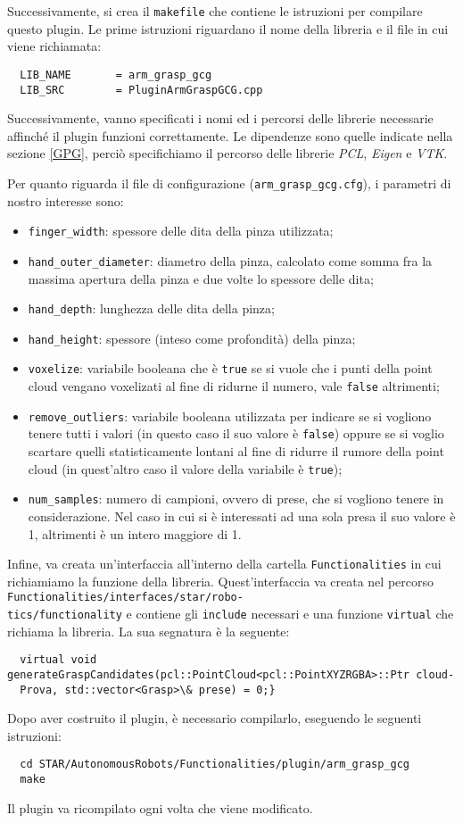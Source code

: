 \documentclass{report}
\begin{document}
\indent Successivamente, si crea il \texttt{makefile} che contiene le istruzioni per compilare questo plugin. Le prime istruzioni riguardano il nome della libreria e il file in cui viene richiamata:
\begin{verbatim}
  LIB_NAME       = arm_grasp_gcg
  LIB_SRC        = PluginArmGraspGCG.cpp
\end{verbatim} 
Successivamente, vanno specificati i nomi ed i percorsi delle librerie necessarie affinché il plugin funzioni correttamente. Le dipendenze sono quelle indicate nella sezione \ref{GPG}, perciò specifichiamo il percorso delle librerie \textit{PCL}, \textit{Eigen} e \textit{VTK}. \par
Per quanto riguarda il file di configurazione (\texttt{arm\_grasp\_gcg.cfg}), i parametri di nostro interesse sono:
\begin{itemize}
\item \texttt{finger\_width}: spessore delle dita della pinza utilizzata;
\item \texttt{hand\_outer\_diameter}: diametro della pinza, calcolato come somma fra la massima apertura della pinza e due volte lo spessore delle dita;
\item \texttt{hand\_depth}: lunghezza delle dita della pinza;
\item \texttt{hand\_height}: spessore (inteso come profondità) della pinza;
\item \texttt{voxelize}: variabile booleana che è \texttt{true} se si vuole che i punti della point cloud vengano voxelizati al fine di ridurne il numero, vale \texttt{false} altrimenti;
\item \texttt{remove\_outliers}: variabile booleana utilizzata per indicare se si vogliono tenere tutti i valori (in questo caso il suo valore è \texttt{false}) oppure se si voglio scartare quelli statisticamente lontani al fine di ridurre il rumore della point cloud (in quest'altro caso il valore della variabile è \texttt{true});
\item \texttt{num\_samples}: numero di campioni, ovvero di prese, che si vogliono tenere in considerazione. Nel caso in cui si è interessati ad una sola presa il suo valore è 1, altrimenti è un intero maggiore di 1.
\end{itemize}
Infine, va creata un'interfaccia all'interno della cartella \texttt{Functionalities} in cui richiamiamo la funzione della libreria. Quest'interfaccia va creata nel percorso \texttt{Functionalities/interfaces/star/robo-}\\\texttt{tics/functionality} e contiene gli \texttt{include} necessari e una funzione \texttt{virtual} che richiama la libreria. La sua segnatura è la seguente:
\begin{verbatim}
  virtual void generateGraspCandidates(pcl::PointCloud<pcl::PointXYZRGBA>::Ptr cloud-
  Prova, std::vector<Grasp>\& prese) = 0;}
\end{verbatim} 
Dopo aver costruito il plugin, è necessario compilarlo, eseguendo le seguenti istruzioni:
\begin{verbatim}
  cd STAR/AutonomousRobots/Functionalities/plugin/arm_grasp_gcg
  make
\end{verbatim} 
Il plugin va ricompilato ogni volta che viene modificato. 
\end{document}
